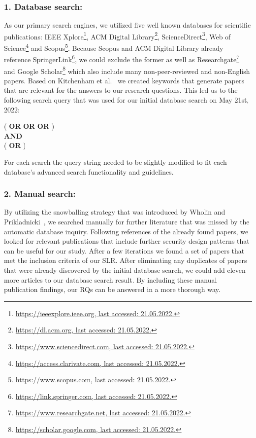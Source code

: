 \subsubsection{1. Database search:} 
As our primary search engines, we utilized five well known databases for scientific publications: IEEE Xplore\footnote{\href{https://ieeexplore.ieee.org}{https://ieeexplore.ieee.org, last accessed: 21.05.2022.}}, ACM Digital Library\footnote{\href{https://dl.acm.org}{https://dl.acm.org, last accessed: 21.05.2022.}}, ScienceDirect\footnote{\href{https://www.sciencedirect.com}{https://www.sciencedirect.com, last accessed: 21.05.2022.}}, Web of Science\footnote{\href{https://access.clarivate.com}{https://access.clarivate.com, last accessed: 21.05.2022.}} and Scopus\footnote{\href{https://www.scopus.com}{https://www.scopus.com, last accessed: 21.05.2022.}}. Because Scopus and ACM Digital Library already reference SpringerLink\footnote{\href{https://link.springer.com}{https://link.springer.com, last accessed: 21.05.2022.}}, we could exclude the former as well as Researchgate\footnote{\href{https://www.researchgate.net}{https://www.researchgate.net, last accessed: 21.05.2022.}} and Google Scholar\footnote{\href{https://scholar.google.com}{https://scholar.google.com, last accessed: 21.05.2022.}} which also include many non-peer-reviewed and non-English papers. Based on Kitchenham et al.~\cite{Kitchenham2007} we created keywords that generate papers that are relevant for the answers to our research questions. This led us to the following search query that was used for our initial database search on May 21st, 2022: 
\begin{center}
	(\emph{} \textbf{OR} \emph{} \textbf{OR}  \emph{} \textbf{OR} \emph{}) \\ \textbf{AND} \\
	(\emph{} \textbf{OR} \emph{})	
\end{center}	
For each search the query string needed to be slightly modified to fit each database's advanced search functionality and guidelines.
	
\subsubsection{2. Manual search:} 
By utilizing the snowballing strategy that was introduced by Wholin and Prikladnicki~\cite{Wohlin2013}, we searched manually for further literature that was missed by the automatic database inquiry. Following references of the already found papers, we looked for relevant publications that include further security design patterns that can be useful for our study. After a few iterations we found a set of papers that met the inclusion criteria of our SLR. After eliminating any duplicates of papers that were already discovered by the initial database search, we could add eleven more articles to our database search result. By including these manual publication findings, our RQs can be answered in a more thorough way. 

